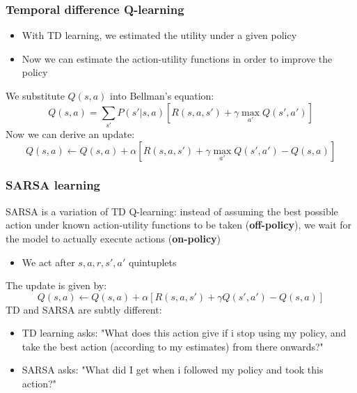 \documentclass{beamer}
\begin{document}
\begin{frame}
	\frametitle{Temporal difference Q-learning}
	\begin{itemize}
		\item<1-> With TD learning, we estimated the utility under a given policy
		\item<2-> Now we can estimate the action-utility functions in order to improve the policy
	\end{itemize}
	\pause
	\pause
	We substitute $Q(s,a)$ into Bellman's equation:
	$$
		Q(s, a) = \sum_{s'} P(s' | s, a) \left[ R(s, a, s') + \gamma \max_{a'} Q(s', a') \right]
	$$
	Now we can derive an update:
	$$
	Q(s, a) \leftarrow Q(s, a) + \alpha \left[ R(s, a, s') + \gamma \max_{a'} Q(s', a') - Q(s, a) \right]
	$$
\end{frame}

\begin{frame}
	\frametitle{SARSA learning}
	SARSA is a variation of TD Q-learning: instead of assuming the best possible action under known action-utility functions to be taken (\textbf{off-policy}), we wait for the model to actually execute actions (\textbf{on-policy})
	\begin{itemize}
		\item We act after $s, a, r, s', a'$ quintuplets
	\end{itemize}
	The update is given by:
	$$
		Q(s, a) \leftarrow Q(s, a) + \alpha \left[ R(s, a, s') + \gamma Q(s', a') - Q(s, a) \right]
	$$
	\pause
	TD and SARSA are subtly different:
	\begin{itemize}
		\item TD learning asks: "What does this action give if i stop using my policy, and take the best action (according to my estimates) from there onwards?"
		\item SARSA asks: "What did I get when i followed my policy and took this action?" 
	\end{itemize}
\end{frame}
\end{document}
